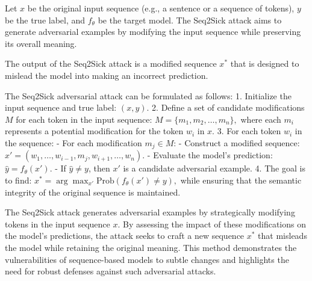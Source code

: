 Let \( x \) be the original input sequence (e.g., a sentence or a sequence of tokens), \( y \) be the true label, and \( f_{\theta} \) be the target model. The Seq2Sick attack aims to generate adversarial examples by modifying the input sequence while preserving its overall meaning.

The output of the Seq2Sick attack is a modified sequence \( x^* \) that is designed to mislead the model into making an incorrect prediction.

The Seq2Sick adversarial attack can be formulated as follows:
1. Initialize the input sequence and true label:
   $
   (x, y).
   $
2. Define a set of candidate modifications \( M \) for each token in the input sequence:
   $
   M = \{m_1, m_2, \ldots, m_n\},
   $
   where each \( m_i \) represents a potential modification for the token \( w_i \) in \( x \).
3. For each token \( w_i \) in the sequence:
   - For each modification \( m_j \in M \):
     - Construct a modified sequence:
     $
     x' = (w_1, \ldots, w_{i-1}, m_j, w_{i+1}, \ldots, w_n).
     $
     - Evaluate the model's prediction:
     $
     \hat{y} = f_{\theta}(x').
     $
     - If \( \hat{y} \neq y \), then \( x' \) is a candidate adversarial example.
4. The goal is to find:
   $
   x^* = \arg\max_{x'} \text{Prob}(f_{\theta}(x') \neq y),
   $
   while ensuring that the semantic integrity of the original sequence is maintained.

The Seq2Sick attack generates adversarial examples by strategically modifying tokens in the input sequence \( x \). By assessing the impact of these modifications on the model's predictions, the attack seeks to craft a new sequence \( x^* \) that misleads the model while retaining the original meaning. This method demonstrates the vulnerabilities of sequence-based models to subtle changes and highlights the need for robust defenses against such adversarial attacks.
